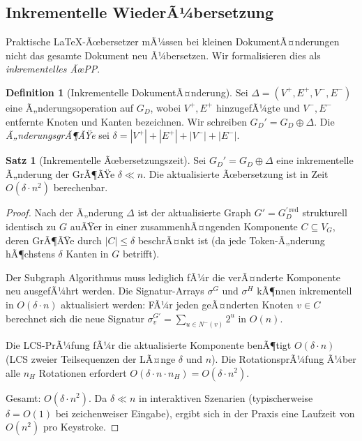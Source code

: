 ﻿\documentclass[a4paper,12pt]{article}
\theoremstyle{definition}
\newtheorem{definition}{Definition}
\newtheorem{satz}{Satz}
\begin{document}
\subsection{Inkrementelle WiederÃ¼bersetzung}
\label{sec:ltx-inkrementell}

Praktische \LaTeX-Ãœbersetzer mÃ¼ssen bei kleinen DokumentÃ¤nderungen nicht
das gesamte Dokument neu Ã¼bersetzen. Wir formalisieren dies als
\emph{inkrementelles ÃœPP}.

\begin{definition}[Inkrementelle DokumentÃ¤nderung]
	\label{def:ltx-delta}
	Sei $\Delta = (V^+, E^+, V^-, E^-)$ eine Ã„nderungsoperation auf $G_D$,
	wobei $V^+, E^+$ hinzugefÃ¼gte und $V^-, E^-$ entfernte Knoten und Kanten
	bezeichnen. Wir schreiben $G_D' = G_D \oplus \Delta$. Die \emph{Ã„nderungsgrÃ¶ÃŸe}
	sei $\delta = |V^+| + |E^+| + |V^-| + |E^-|$.
\end{definition}

\begin{satz}[Inkrementelle Ãœbersetzungszeit]
	\label{satz:ltx-inkrementell}
	Sei $G_D' = G_D \oplus \Delta$ eine inkrementelle Ã„nderung der GrÃ¶ÃŸe
	$\delta \ll n$. Die aktualisierte Ãœbersetzung ist in Zeit
	$O(\delta \cdot n^2)$ berechenbar.
\end{satz}

\begin{proof}
	Nach der Ã„nderung $\Delta$ ist der aktualisierte Graph $G' = G_D^{\prime\,\mathrm{red}}$
	strukturell identisch zu $G$ auÃŸer in einer zusammenhÃ¤ngenden Komponente
	$C \subseteq V_G$, deren GrÃ¶ÃŸe durch $|C| \le \delta$ beschrÃ¤nkt ist
	(da jede Token-Ã„nderung hÃ¶chstens $\delta$ Kanten in $G$ betrifft).
	
	Der Subgraph Algorithmus muss lediglich fÃ¼r die verÃ¤nderte Komponente
	neu ausgefÃ¼hrt werden. Die Signatur-Arrays $\sigma^G$ und $\sigma^H$
	kÃ¶nnen inkrementell in $O(\delta \cdot n)$ aktualisiert werden:
	FÃ¼r jeden geÃ¤nderten Knoten $v \in C$ berechnet sich die neue Signatur
	$\sigma_v^{G'} = \sum_{u \in N^-(v)} 2^u$ in $O(n)$.
	
	Die LCS-PrÃ¼fung fÃ¼r die aktualisierte Komponente benÃ¶tigt
	$O(\delta \cdot n)$ (LCS zweier Teilsequenzen der LÃ¤nge $\delta$ und $n$).
	Die RotationsprÃ¼fung Ã¼ber alle $n_H$ Rotationen erfordert
	$O(\delta \cdot n \cdot n_H) = O(\delta \cdot n^2)$.
	
	Gesamt: $O(\delta \cdot n^2)$. Da $\delta \ll n$ in interaktiven
	Szenarien (typischerweise $\delta = O(1)$ bei zeichenweiser Eingabe),
	ergibt sich in der Praxis eine Laufzeit von $O(n^2)$ pro Keystroke. 
\end{proof}
\end{document}
